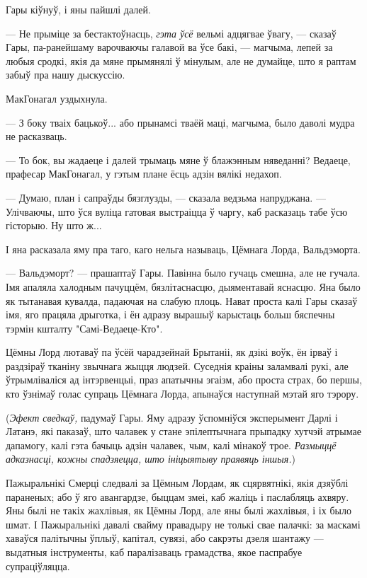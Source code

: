 Гары кіўнуў, і яны пайшлі далей.

--- Не прыміце за бестактоўнасць, \emph{гэта ўсё} вельмі адцягвае ўвагу, --- сказаў Гары,
па-ранейшаму варочваючы галавой ва ўсе бакі, --- магчыма, лепей за любыя сродкі, якія да 
мяне прымянялі ў мінулым, але не думайце, што я раптам забыў пра нашу дыскуссію.

МакГонагал уздыхнула.

--- З боку тваіх бацькоў... або прынамсі тваёй маці, магчыма, было даволі мудра не расказваць.

--- То бок, вы жадаеце і далей трымаць мяне ў блажэнным няведанні? Ведаеце, прафесар МакГонагал,
у гэтым плане ёсць адзін вялікі недахоп.

--- Думаю, план і сапраўды бязглузды, --- сказала ведзьма напруджана. --- Улічваючы, што
ўся вуліца гатовая выстраіцца ў чаргу, каб расказаць табе ўсю гісторыю. Ну што ж...

І яна расказала яму пра таго, каго нельга называць, Цёмнага Лорда, Вальдэморта.

--- Вальдэморт? --- прашаптаў Гары. Павінна было гучаць смешна, але не гучала. Імя апаляла
халодным пачуццём, бязлітаснасцю, дыяментавай яснасцю. Яна было як тытанавая кувалда, падаючая
на слабую плоць. Нават проста калі Гары сказаў імя, яго працяла дрыготка, і ён адразу вырашыў
карыстаць больш бяспечны тэрмін кшталту "Самі-Ведаеце-Кто".

Цёмны Лорд лютаваў па ўсёй чарадзейнай Брытаніі, як дзікі воўк, ён ірваў і раздзіраў тканіну
звычнага жыцця людзей. Суседнія краіны заламвалі рукі, але ўтрымліваліся ад інтэрвенцыі, праз
апатычны эгаізм, або проста страх, бо першы, кто ўзнімаў голас супраць Цёмнага Лорда, 
апынаўся наступнай мэтай яго тэрору.

(\emph{Эфект сведкаў,} падумаў Гары. Яму адразу ўспомніўся эксперымент Дарлі і Латанэ, які 
паказаў, што чалавек у стане эпілептычнага прыпадку хутчэй атрымае дапамогу, калі гэта бачыць
адзін чалавек, чым, калі мінакоў трое. \emph{Размыццё адказнасці, кожны спадзяецца, што 
ініцыятыву праявяць іншыя.})

Пажыральнікі Смерці следвалі за Цёмным Лордам, як сцярвятнікі, якія дзяўблі параненых; або ў яго
авангардзе, быццам змеі, каб жаліць і паслабляць ахвяру. Яны былі не такіх жахлівыя, як 
Цёмны Лорд, але яны былі жахлівыя, і іх было шмат. І Пажыральнікі давалі свайму правадыру не 
толькі свае палачкі: за маскамі хаваўся палітычны ўплыў, капітал, сувязі, або сакрэты дзеля
шантажу --- выдатныя інструменты, каб паралізаваць грамадства, якое паспрабуе супраціўляцца.

